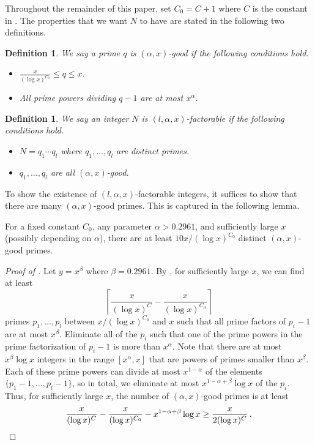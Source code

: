 \documentclass{toc}
\newtheorem{define}[theorem]{Definition}
\begin{document}
Throughout the remainder of this paper, set $C_0 = C+1$ where $C$ is the constant in .  The properties that we want $N$ to have are stated in the following two definitions.
\begin{define}
We say a prime $q$ is $(\alpha,x)$-good if the following
%
conditions hold.    %
\begin{itemize}
    \item $\frac{x}{(\log x)^{C_0}} \leq q \leq x $.
    \item All prime powers dividing $q-1$ are at most $x^{\alpha} $.
\end{itemize}
\end{define}

\begin{define}
We say an integer $N$ is $(l, \alpha, x)$-factorable if the following
%
conditions hold.    %
\begin{itemize}
    \item $N = q_1 \cdots q_l$ where $q_1, \dots , q_l$ are distinct primes.
    \item $q_1, \dots , q_l$ are all $(\alpha,x)$-good.
\end{itemize}
\end{define}

To show the existence of $(l, \alpha, x)$-factorable integers, it suffices to show that there are many $(\alpha,x)$-good primes.  This is captured in the following lemma.
\begin{lemma}\label{construction}
For a fixed constant $C_0$, any parameter $\alpha > 0.2961$, and sufficiently large $x$ (possibly depending on $\alpha$), there are at least $10x/(\log x)^{C_0}$ distinct $(\alpha,x)$-good primes.
\end{lemma}








\begin{proof}[Proof of ]  Let $y = x^{\beta}$ where $\beta =  0.2961$.  By , for sufficiently large $x$, we can find at least
%
\[ \left\lceil \frac{x}{(\log x)^C} - \frac{x}{(\log x)^{C_0 }} \right\rceil \] primes $p_1, \dots , p_l$ between $x/(\log x)^{C_0 }$ and $x$ such that all prime factors of $p_i - 1$ are at most $x^{\beta}$.  Eliminate all of the $p_i$ such that one of the prime powers in the prime factorization of $p_i - 1$ is more than $x^{\alpha}$.  Note that there are at most $x^{\beta} \log x$ integers in the range $[x^{\alpha}, x]$  that are powers of primes smaller than $x^{\beta}$.  Each of these prime powers can divide at most $x^{1 - \alpha}$ of the elements $\{ p_1 -1 , \dots , p_l-1\}$, so in total, we eliminate at most $x^{1 - \alpha + \beta} \log x$ of the $p_i$.  Thus, for sufficiently large $x$, the number of $(\alpha ,x)$-good primes is at least
\[
\frac{x}{(\log x)^C} - \frac{x}{(\log x)^{C_0 }} - x^{1 - \alpha + \beta} \log x \geq \frac{x}{2(\log x)^C} \,. \qedhere
\]
\end{proof}
\end{document}
